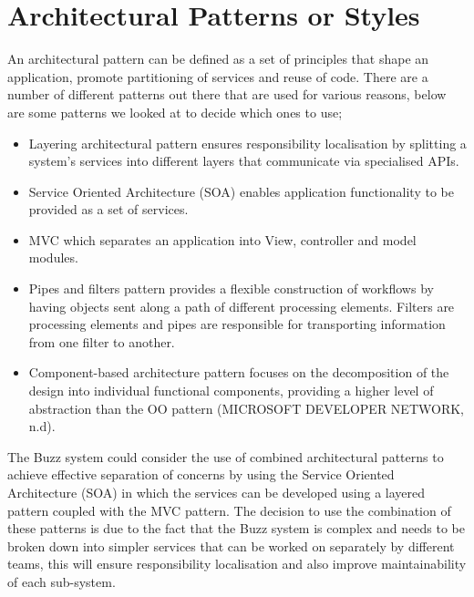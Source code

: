 \documentclass[a4paper]{article}
\begin{document}
\section{Architectural Patterns or Styles}
An architectural pattern can be defined as a set of principles that shape an application, promote partitioning of services and reuse of code. There are a number of different patterns out there that are used for various reasons, below are some patterns we looked at to decide which ones to use;
\begin{itemize}
			\item Layering architectural pattern ensures responsibility localisation by splitting a system's services into different layers that communicate via specialised APIs.
			\item Service Oriented Architecture (SOA) enables application functionality to be provided as a set of services.
			\item MVC which separates an application into View, controller and model modules.
			\item Pipes and filters pattern provides a flexible construction of workflows by having objects sent along a path of different processing elements. Filters are processing elements and pipes are responsible for transporting information from one filter to another.
			\item Component-based architecture pattern focuses on the decomposition of the design into individual functional components, providing a higher level of abstraction than the OO pattern (MICROSOFT DEVELOPER NETWORK, n.d). \\[1em]
\end{itemize}
The Buzz system could consider the use of combined architectural patterns to achieve effective separation of concerns by using the Service Oriented Architecture (SOA) in which the services can be developed using a layered pattern coupled with the MVC pattern. 
The decision to use the combination of these patterns is due to the fact that the Buzz system is complex and needs to be broken down into simpler services that can be worked on separately by different teams, this will ensure responsibility localisation and also improve maintainability of each sub-system. 
\end{document}
